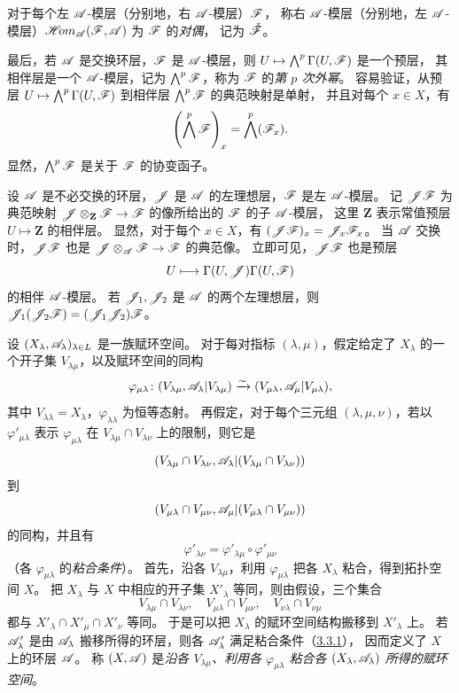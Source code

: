 对于每个左 $\mathscr A$-模层（分别地，右 $\mathscr A$-模层）$\mathscr F$，
称右 $\mathscr A$-模层（分别地，左 $\mathscr A$-模层）$\mathscr{H}\!om_{\mathscr A}(\mathscr F,\mathscr A)$ 为 $\mathscr F$ 的\emph{对偶}，
记为 $\check{\mathscr F}$。

最后，若 $\mathscr A$ 是交换环层，$\mathscr F$ 是 $\mathscr A$-模层，则
$U\mapsto\bigwedge^p\Gamma(U,\mathscr F)$ 是一个预层，
其相伴层是一个 $\mathscr A$-模层，记为 $\bigwedge^p\mathscr F$，称为 $\mathscr F$ 的\emph{第 $p$ 次外幂}。
容易验证，从预层 $U\mapsto\bigwedge^p\Gamma(U,\mathscr F)$ 到相伴层 $\bigwedge^p\mathscr F$ 的典范映射是单射，
并且对每个 $x\in X$，有
\[
 \left(\bigwedge^p\mathscr F\right)_x=\bigwedge^p(\mathscr F_x).
\]
显然，$\bigwedge^p\mathscr F$ 是关于 $\mathscr F$ 的协变函子。

设 $\mathscr A$ 是不必交换的环层，$\mathscr J$ 是 $\mathscr A$ 的左理想层，$\mathscr F$ 是左 $\mathscr A$-模层。
记 $\mathscr J\mathscr F$ 为典范映射 $\mathscr J\otimes_{\mathbf Z}\mathscr F\to\mathscr F$ 的像所给出的 $\mathscr F$ 的子 $\mathscr A$-模层，
这里 $\mathbf Z$ 表示常值预层 $U\mapsto\mathbf Z$ 的相伴层。
显然，对于每个 $x\in X$，有 $(\mathscr J\mathscr F)_x=\mathscr J_x\mathscr F_x$。
当 $\mathscr A$ 交换时，$\mathscr J\mathscr F$ 也是 $\mathscr J\otimes_{\mathscr A}\mathscr F\to\mathscr F$ 的典范像。
立即可见，$\mathscr J\mathscr F$ 也是预层
\[
 U\longmapsto\Gamma(U,\mathscr J)\Gamma(U,\mathscr F)
\]
的相伴 $\mathscr A$-模层。
若 $\mathscr J_1,\mathscr J_2$ 是 $\mathscr A$ 的两个左理想层，则
$\mathscr J_1(\mathscr J_2\mathscr F)=(\mathscr J_1\mathscr J_2)\mathscr F$。

设 $(X_\lambda,\mathscr A_\lambda)_{\lambda\in L}$ 是一族赋环空间。
对于每对指标 $(\lambda,\mu)$，假定给定了 $X_\lambda$ 的一个开子集 $V_{\lambda\mu}$，以及赋环空间的同构
\[
 \varphi_{\mu\lambda}\colon
 (V_{\lambda\mu},\mathscr A_\lambda|V_{\lambda\mu})
 \xrightarrow{\sim}
 (V_{\mu\lambda},\mathscr A_\mu|V_{\mu\lambda}),
\]
其中 $V_{\lambda\lambda}=X_\lambda$，$\varphi_{\lambda\lambda}$ 为恒等态射。
再假定，对于每个三元组 $(\lambda,\mu,\nu)$，若以 $\varphi'_{\mu\lambda}$ 表示
$\varphi_{\mu\lambda}$ 在 $V_{\lambda\mu}\cap V_{\lambda\nu}$ 上的限制，则它是
\[
 (V_{\lambda\mu}\cap V_{\lambda\nu},
  \mathscr A_\lambda|(V_{\lambda\mu}\cap V_{\lambda\nu}))
\]
到
\[
 (V_{\mu\lambda}\cap V_{\mu\nu},
  \mathscr A_\mu|(V_{\mu\lambda}\cap V_{\mu\nu}))
\]
的同构，并且有
\[
 \varphi'_{\lambda\nu}
 =\varphi'_{\lambda\mu}\circ\varphi'_{\mu\nu}
\]
（各 $\varphi_{\mu\lambda}$ 的\emph{粘合条件}）。
首先，沿各 $V_{\lambda\mu}$，利用 $\varphi_{\mu\lambda}$ 把各 $X_\lambda$ 粘合，得到拓扑空间 $X$。
把 $X_\lambda$ 与 $X$ 中相应的开子集 $X'_\lambda$ 等同，则由假设，三个集合
\[
 V_{\lambda\mu}\cap V_{\lambda\nu},\quad
 V_{\mu\lambda}\cap V_{\mu\nu},\quad
 V_{\nu\lambda}\cap V_{\nu\mu}
\]
都与 $X'_\lambda\cap X'_\mu\cap X'_\nu$ 等同。
于是可以把 $X_\lambda$ 的赋环空间结构搬移到 $X'_\lambda$ 上。
若 $\mathscr A'_\lambda$ 是由 $\mathscr A_\lambda$ 搬移所得的环层，则各 $\mathscr A'_\lambda$ 满足粘合条件（\hyperlink{para:0:3.3.1}{3.3.1}），
因而定义了 $X$ 上的环层 $\mathscr A$。
称 $(X,\mathscr A)$ 是\emph{沿各 $V_{\lambda\mu}$、利用各 $\varphi_{\mu\lambda}$ 粘合各
$(X_\lambda,\mathscr A_\lambda)$ 所得的赋环空间}。

